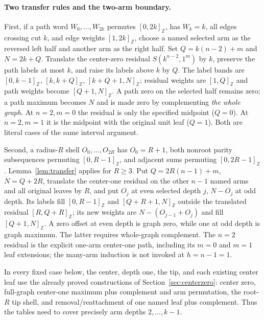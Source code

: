 \documentclass[11pt,a4paper]{article}
\theoremstyle{definition}\newtheorem{definition}[theorem]{Definition}
\theoremstyle{remark}\newtheorem{remark}[theorem]{Remark}
\newcommand{\ints}[2]{[#1,#2]_{\mathbb Z}}
\begin{document}
\paragraph{Two transfer rules and the two-arm boundary.}
First, if a path word $W_0,\ldots,W_{2k}$ permutes $\ints0{2k}$, has
$W_k=k$, all edges crossing cut $k$, and edge weights $\ints1{2k}$,
choose a named selected arm as the reversed left half and another arm as
the right half. Set $Q=k(n-2)+m$ and $N=2k+Q$. Translate the center-zero
residual $S(k^{n-2},1^m)$ by $k$, preserve the path labels at most $k$,
and raise its labels above $k$ by $Q$. The label bands are
$\ints0{k-1}$, $\ints k{k+Q}$, $\ints{k+Q+1}N$; residual weights are
$\ints1Q$ and path weights become $\ints{Q+1}N$. A path zero on the
selected half remains zero; a path maximum becomes $N$ and is made zero
by complementing \emph{the whole graph}. At $n=2,m=0$ the residual is
only the specified midpoint ($Q=0$). At $n=2,m=1$ it is the midpoint
with the original unit leaf ($Q=1$). Both are literal cases of the
same interval argument.

Second, a radius-$R$ shell $O_0,\ldots,O_{2R}$ has $O_0=R+1$,
both nonroot parity subsequences permuting $\ints0{R-1}$, and adjacent
sums permuting $\ints0{2R-1}$. Lemma~\ref{lem:transfer} applies for
$R\ge3$. Put $Q=2R(n-1)+m$, $N=Q+2R$, translate the center-one residual
on the other $n-1$ named arms and all original leaves by $R$, and put
$O_j$ at even selected depth $j$, $N-O_j$ at odd depth. Its labels
fill $\ints0{R-1}$ and $\ints{Q+R+1}N$ outside the translated residual
$\ints R{Q+R}$; its new weights are
$N-(O_{j-1}+O_j)$ and fill $\ints{Q+1}N$. A zero offset at even depth
is graph zero, while one at odd depth is graph maximum. The latter
requires whole-graph complement. The $n=2$ residual is the explicit
one-arm center-one path, including its $m=0$ and $m=1$ leaf extensions;
the many-arm induction is not invoked at $h=n-1=1$.

In every fixed case below, the center, depth one, the tip, and each
existing center leaf use the already proved constructions of
Section~\ref{sec:centerzero}: center zero, full-graph center-one
maximum plus complement and arm permutation, the root-$R$ tip shell,
and removal/reattachment of one named leaf plus complement. Thus the
tables need to cover precisely arm depths $2,\ldots,k-1$.
\end{document}
